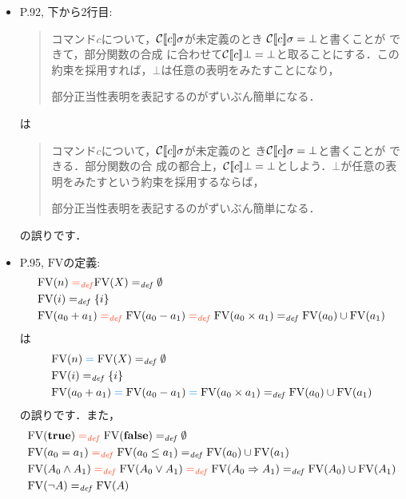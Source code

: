 \documentclass[12pt,titlepage,twoside,openright,dvipdfmx]{jsbook}
\newcommand\old[1]{%
  \textcolor[rgb]{1.0,0.25,0.1}{#1}%
  }
\newcommand\new[1]{%
  \textcolor[rgb]{0,0.55,1.0}{#1}%
  }
\theoremstyle{definition}
\begin{document}
\begin{itemize}
\item P.92, 下から2行目:
  \begin{quote}
    コマンド$c$について，$\mathcal{C}\llbracket{c}\rrbracket\sigma$が未定義のとき
    $\mathcal{C}\llbracket{c}\rrbracket\sigma = \bot$と書くことが\old{できて，部分関数の合成
    に合わせて$\mathcal{C}\llbracket{c}\rrbracket\bot = \bot$と取ることにする．この
    約束を採用すれば，$\bot$は任意の表明をみたすことになり，}
    部分正当性表明を表記するのがずいぶん簡単になる．
  \end{quote}
  は
  \begin{quote}
    コマンド$c$について，$\mathcal{C}\llbracket{c}\rrbracket\sigma$が未定義のと
    き$\mathcal{C}\llbracket{c}\rrbracket\sigma = \bot$と書くことが\new{できる．部分関数の合
    成の都合上，$\mathcal{C}\llbracket{c}\rrbracket\bot =
    \bot$としよう．$\bot$が任意の表明をみたすという約束を採用するならば，}
    部分正当性表明を表記するのがずいぶん簡単になる．
  \end{quote}
  の誤りです．
\item P.95, $\mathrm{FV}$の定義:
  \begin{align*}
    & \FV{n} \old{{}=_{\mathit{def}{}}} \FV{X} =_{\mathit{def}} \emptyset \\
    & \FV{i} =_{\mathit{def}} \{i\} \\
    & \FV{a_0 + a_1} \old{{}=_{\mathit{def}}{}} \FV{a_0 - a_1} \old{{}=_{\mathit{def}}{}} \FV{a_0 \times a_1} =_{\mathit{def}} \FV{a_0} \cup \FV{a_1}\\
  \end{align*}
  は
  \begin{align*}
    & \FV{n} \new{{}={}} \FV{X} =_{\mathit{def}} \emptyset \\
    & \FV{i} =_{\mathit{def}} \{i\} \\
    & \FV{a_0 + a_1} \new{{}={}} \FV{a_0 - a_1} \new{{}={}} \FV{a_0 \times a_1} =_{\mathit{def}} \FV{a_0} \cup \FV{a_1}\\
  \end{align*}
  の誤りです．また，
  \begin{align*}
    & \FV{\Ttrue} \old{{}=_{\mathit{def}}{}} \FV{\Tfalse} =_{\mathit{def}} \emptyset \\
    & \FV{a_0 = a_1} \old{{}=_{\mathit{def}}{}} \FV{a_0 \leq a_1} =_{\mathit{def}} \FV{a_0} \cup \FV{a_1} \\
    & \FV{A_0 \wedge A_1} \old{{}=_{\mathit{def}}{}} \FV{A_0 \vee A_1} \old{{}=_{\mathit{def}}{}} \FV{A_0 \Rightarrow A_1} =_{\mathit{def}} \FV{A_0} \cup \FV{A_1} \\
    & \FV{\neg{A}} =_{\mathit{def}} \FV{A} \\

\end{align*}
\end{itemize}
\end{document}
